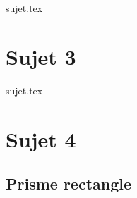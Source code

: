 \documentclass[a4paper, 10pt]{book}
\begin{document}
\resetQ
{sujet.tex}

\newpage

\chapter{Sujet 3}

\resetQ
{sujet.tex}

\newpage

\chapter{Sujet 4}

\section{Prisme rectangle}
\end{document}
